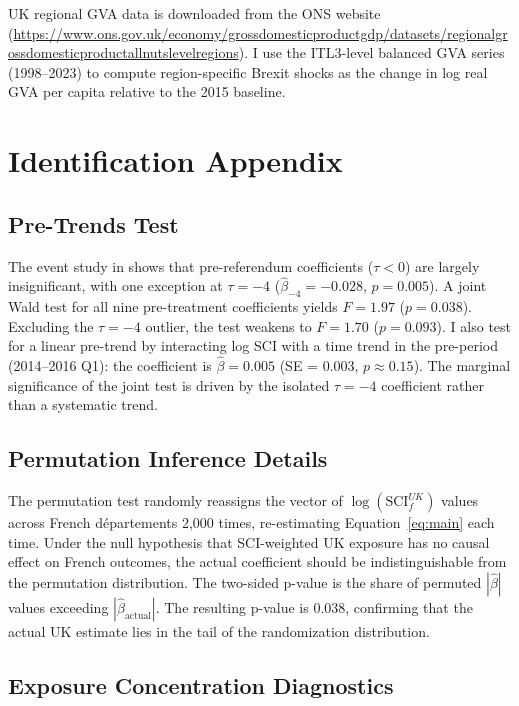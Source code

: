 \documentclass[12pt]{article}
\begin{document}
UK regional GVA data is downloaded from the ONS website (\url{https://www.ons.gov.uk/economy/grossdomesticproductgdp/datasets/regionalgrossdomesticproductallnutslevelregions}). I use the ITL3-level balanced GVA series (1998--2023) to compute region-specific Brexit shocks as the change in log real GVA per capita relative to the 2015 baseline.

\section{Identification Appendix}

\subsection{Pre-Trends Test}

The event study in  shows that pre-referendum coefficients ($\tau < 0$) are largely insignificant, with one exception at $\tau = -4$ ($\hat{\beta}_{-4} = -0.028$, $p = 0.005$). A joint Wald test for all nine pre-treatment coefficients yields $F = 1.97$ ($p = 0.038$). Excluding the $\tau = -4$ outlier, the test weakens to $F = 1.70$ ($p = 0.093$). I also test for a linear pre-trend by interacting log SCI with a time trend in the pre-period (2014--2016 Q1): the coefficient is $\hat{\beta} = 0.005$ (SE = 0.003, $p \approx 0.15$). The marginal significance of the joint test is driven by the isolated $\tau = -4$ coefficient rather than a systematic trend.

\subsection{Permutation Inference Details}

The permutation test randomly reassigns the vector of $\log(\text{SCI}_f^{UK})$ values across French d\'epartements 2,000 times, re-estimating Equation~\ref{eq:main} each time. Under the null hypothesis that SCI-weighted UK exposure has no causal effect on French outcomes, the actual coefficient should be indistinguishable from the permutation distribution. The two-sided p-value is the share of permuted $|\hat{\beta}|$ values exceeding $|\hat{\beta}_{\text{actual}}|$. The resulting p-value is 0.038, confirming that the actual UK estimate lies in the tail of the randomization distribution.

\subsection{Exposure Concentration Diagnostics}
\end{document}
